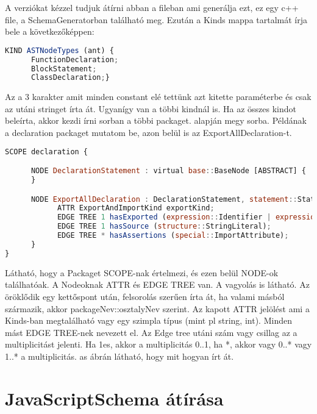 A verziókat kézzel tudjuk átírni abban a fileban ami generálja ezt, ez egy c++ file, a SchemaGeneratorban található meg.
Ezután a Kinds mappa tartalmát írja bele a következőképpen:
\begin{lstlisting}[caption={Asg file kind},label={lst:asg_file_kinds}, language={JavaScript}]
KIND ASTNodeTypes (ant) {
      FunctionDeclaration;
      BlockStatement;
      ClassDeclaration;}
\end{lstlisting}
Az a 3 karakter amit minden constant elé tettünk azt kitette paraméterbe és csak az utáni stringet írta át. Ugyanígy van a többi kindnál is.
Ha az összes kindot beleírta, akkor kezdi írni sorban a többi packaget.  alapján megy sorba.
Példának a declaration packaget mutatom be, azon belül is az ExportAllDeclaration-t.
\begin{lstlisting}[caption={Asg file ExportAllDeclaration},label={lst:asg_file_export_all_declaration}, language={JavaScript}]
SCOPE declaration {

      NODE DeclarationStatement : virtual base::BaseNode [ABSTRACT] {
      }

      NODE ExportAllDeclaration : DeclarationStatement, statement::Statement, virtual statement::ProgramStatement, special::Node {
            ATTR ExportAndImportKind exportKind;
            EDGE TREE 1 hasExported (expression::Identifier | expression::LiteralExpression);
            EDGE TREE 1 hasSource (structure::StringLiteral);
            EDGE TREE * hasAssertions (special::ImportAttribute);
      }
}
\end{lstlisting}
Látható, hogy a Packaget SCOPE-nak értelmezi, és ezen belül NODE-ok találhatóak.
A Nodeoknak ATTR és EDGE TREE van. A vagyolás is látható.
Az öröklődik egy kettőspont után, felsorolás szerűen írta át, ha valami másból származik, akkor packageNev::osztalyNev szerint.
Az kapott ATTR jelölést ami a Kinds-ban megtalálható vagy egy szimpla típus (mint pl string, int).
Minden mást EDGE TREE-nek nevezett el. Az Edge tree utáni szám vagy csillag az a multiplicitást jelenti.
Ha 1es, akkor a multiplicitás 0..1, ha *, akkor vagy 0..* vagy 1..* a multiplicitás.
as ábrán látható, hogy mit hogyan írt át.

\section{JavaScriptSchema átírása}

\noindent

